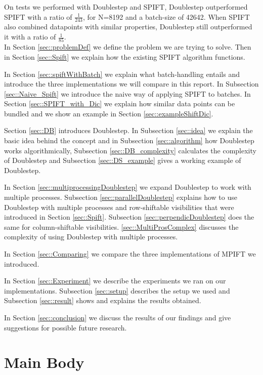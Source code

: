 \documentclass[12pt]{article}
\begin{document}
On tests we performed with Doublestep and SPIFT, Doublestep outperformed SPIFT with a ratio of $\frac{1}{243}$, for N=8192 and a batch-size of 42642. When SPIFT also combined datapoints with similar properties, Doublestep still outperformed it with a ratio of $\frac{1}{85}$.\\

In Section \ref{sec::problemDef} we define the problem we are trying to solve.  Then in Section \ref{sec::Spift} we explain how the existing SPIFT algorithm functions. 

In Section \ref{sec::spiftWithBatch} we explain what batch-handling entails and introduce the three implementations we will compare in this report. In Subsection \ref{sec::Naive_Spift} we introduce the naive way of applying SPIFT to batches. In Section \ref{sec::SPIFT_with_Dic} we explain how similar data points can be bundled and we show an example in Section \ref{sec::exampleShiftDic}.

Section \ref{sec::DB} introduces Doublestep. In Subsection \ref{sec::idea} we explain the basic idea behind the concept and in Subsection \ref{sec::algorithm} how Doublestep works algorithmically, Subsection \ref{sec::DB_complexity} calculates the complexity of Doublestep and Subsection \ref{sec::DS_example} gives a working example of Doublestep.

In Section \ref{sec::multiprocessingDoublestep} we expand Doublestep to work with multiple processes. Subsection \ref{sec::parallelDoublestep} explains how to use Doublestep with multiple processes and row-shiftable visibilities that were introduced in Section \ref{sec::Spift}. Subsection \ref{sec::perpendicDoublestep} does the same for column-shiftable visibilities. \ref{sec::MultiProsComplex} discusses the complexity of using Doublestep with multiple processes.

In Section \ref{sec::Comparing} we compare the three implementations of MPIFT we introduced.

In Section \ref{sec::Experiment} we describe the experiments we ran on our implementations. Subsection \ref{sec::setup} describes the setup we used and Subsection \ref{sec::result} shows and explains the results obtained.

In Section \ref{sec::conclusion} we discuss the results of our findings and give suggestions for possible future research.

\pagebreak
\section{Main Body}
\label{sec::mainBody}
\end{document}
